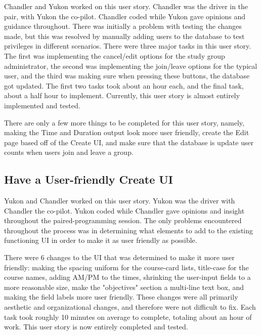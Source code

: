\documentclass[12pt,letterpaper]{article}
\begin{document}
Chandler and Yukon worked on this user story. Chandler was the driver in the pair, with Yukon the co-pilot. Chandler coded while Yukon gave opinions and guidance throughout. There was initially a problem with testing the changes made, but this was resolved by manually adding users to the database to test privileges in different scenarios. There were three major tasks in this user story. The first was implementing the cancel/edit options for the study group administrator, the second was implementing the join/leave options for the typical user, and the third was making sure when pressing these buttons, the database got updated. The first two tasks took about an hour each, and the final task, about a half hour to implement. Currently, this user story is almost entirely implemented and tested. 

There are only a few more things to be completed for this user story, namely, making the Time and Duration output look more user friendly, create the Edit page based off of the Create UI, and make sure that the database is update user counts when users join and leave a group. 

\subsection{Have a User-friendly Create UI}
Yukon and Chandler worked on this user story. Yukon was the driver with Chandler the co-pilot. Yukon coded while Chandler gave opinions and insight throughout the paired-programming session. The only problems encountered throughout the process was in determining what elements to add to the existing functioning UI in order to make it as user friendly as possible.

There were 6 changes to the UI that was determined to make it more user friendly: making the spacing uniform for the course-card lists, title-case for the course names, adding AM/PM to the times, shrinking the user-input fields to a more reasonable size, make the "objectives" section a multi-line text box, and making the field labels more user friendly. These changes were all primarily aesthetic and organizational changes, and therefore were not difficult to fix. Each task took roughly 10 minutes on average to complete, totaling about an hour of work. This user story is now entirely completed and tested. 
\end{document}
